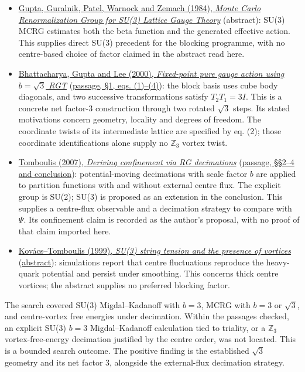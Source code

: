\documentclass[11pt,a4paper]{article}
\newcommand{\tightlist}{\setlength{\itemsep}{0pt}\setlength{\parskip}{0pt}}
\begin{document}
\begin{itemize}
\tightlist
\item
  \href{https://doi.org/10.1103/PhysRevLett.53.1721}{Gupta, Guralnik,
  Patel, Warnock and Zemach (1984), \emph{Monte Carlo Renormalization
  Group for SU(3) Lattice Gauge Theory}} (abstract): SU(3) MCRG
  estimates both the beta function and the generated effective action.
  This supplies direct SU(3) precedent for the blocking programme, with
  no centre-based choice of factor claimed in the abstract read here.
\item
  \href{https://doi.org/10.1016/S0920-5632(00)00465-5}{Bhattacharya,
  Gupta and Lee (2000), \emph{Fixed-point pure gauge action using
  \(b=\sqrt3\) RGT}}
  (\href{https://arxiv.org/pdf/hep-lat/9910046}{passage, §1, eqs.
  (1)--(4)}): the block basis uses cube body diagonals, and two
  successive transformations satisfy \(T_2T_1=3I\). This is a concrete
  net factor-3 construction through two rotated \(\sqrt3\) steps. Its
  stated motivations concern geometry, locality and degrees of freedom.
  The coordinate twists of its intermediate lattice are specified by eq.
  (2); those coordinate identifications alone supply no \(\mathbb Z_3\)
  vortex twist.
\item
  \href{https://doi.org/10.22323/1.042.0336}{Tomboulis (2007),
  \emph{Deriving confinement via RG decimations}}
  (\href{https://arxiv.org/pdf/0710.1894}{passage, §§2--4 and
  conclusion}): potential-moving decimations with scale factor \(b\) are
  applied to partition functions with and without external centre flux.
  The explicit group is SU(2); SU(3) is proposed as an extension in the
  conclusion. This supplies a centre-flux observable and a decimation
  strategy to compare with \(\Psi\). Its confinement claim is recorded
  as the author's proposal, with no proof of that claim imported here.
\item
  \href{https://doi.org/10.1016/S0920-5632(99)85139-1}{Kovács--Tomboulis
  (1999), \emph{SU(3) string tension and the presence of vortices}}
  (\href{https://arxiv.org/abs/hep-lat/9808046}{abstract}): simulations
  report that centre fluctuations reproduce the heavy-quark potential
  and persist under smoothing. This concerns thick centre vortices; the
  abstract supplies no preferred blocking factor.
\end{itemize}

The search covered SU(3) Migdal--Kadanoff with \(b=3\), MCRG with
\(b=3\) or \(\sqrt3\), and centre-vortex free energies under decimation.
Within the passages checked, an explicit SU(3) \(b=3\) Migdal--Kadanoff
calculation tied to triality, or a \(\mathbb Z_3\) vortex-free-energy
decimation justified by the centre order, was not located. This is a
bounded search outcome. The positive finding is the established
\(\sqrt3\) geometry and its net factor 3, alongside the external-flux
decimation strategy.
\end{document}
